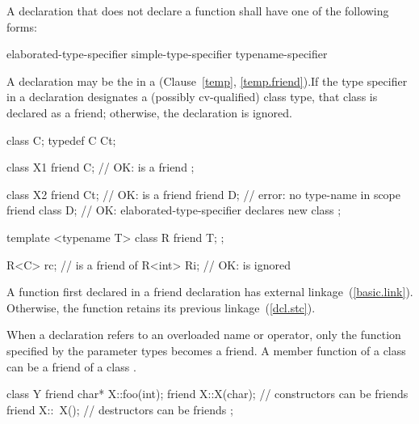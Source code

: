 \pnum
A  declaration that does not declare a function
shall have one of the following forms:

\begin{ncsimplebnf}
 elaborated-type-specifier \terminal{;}\br
{} simple-type-specifier \terminal{;}\br
{} typename-specifier \terminal{;}
\end{ncsimplebnf}

\enternote A  declaration may be the
 in a 
(Clause~\ref{temp}, \ref{temp.friend}).\exitnote If the
type specifier in a  declaration designates a (possibly
cv-qualified) class type, that class is declared as a friend; otherwise, the
 declaration is ignored. \enterexample

\begin{codeblock}
class C;
typedef C Ct;

class X1 {
  friend C;         // OK:  is a friend
};

class X2 {
  friend Ct;        // OK:  is a friend
  friend D;         // error: no type-name  in scope
  friend class D;   // OK: elaborated-type-specifier declares new class
};

template <typename T> class R {
  friend T;
};

R<C> rc;            //  is a friend of 
R<int> Ri;          // OK:  is ignored
\end{codeblock}
\exitexample

\pnum
{}%
A function first declared in a friend declaration
has external linkage~(\ref{basic.link}).
Otherwise, the function retains its previous linkage~(\ref{dcl.stc}).

\pnum
{}%
When a
declaration refers to an overloaded name or operator, only the function specified
by the parameter types becomes a friend.
A member function of a class
can be a friend of
a class
.
%
\enterexample

\begin{codeblock}
class Y {
  friend char* X::foo(int);
  friend X::X(char);            // constructors can be friends
  friend X::~X();               // destructors can be friends
};
\end{codeblock}
\exitexample

